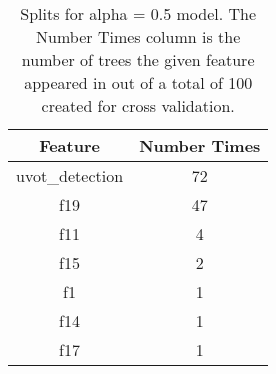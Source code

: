 \begin{table}[H]
\begin{center}
\begin{tabular}{cc}
  \hline
Feature & Number Times \\ 
  \hline
uvot\_detection & 72 \\ 
  f19 & 47 \\ 
  f11 & 4 \\ 
  f15 & 2 \\ 
  f1 & 1 \\ 
  f14 & 1 \\ 
  f17 & 1 \\ 
   \hline
\end{tabular}
\caption{Splits for alpha = 0.5 model. The Number Times column is the number of trees the given feature appeared in out of a total of 100 created for cross validation.}
\end{center}
\end{table}
